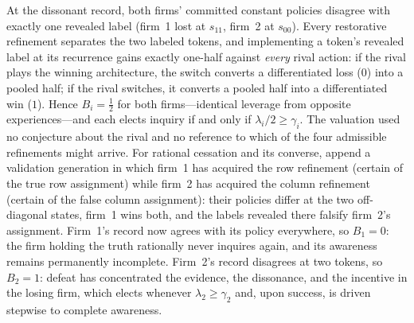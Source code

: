 \begin{excont}
At the dissonant record, both firms' committed constant policies disagree
with exactly one revealed label (firm~1 lost at $s_{11}$, firm~2 at
$s_{00}$).  Every restorative refinement separates the two labeled tokens,
and implementing a token's revealed label at its recurrence gains exactly
one-half against \emph{every} rival action: if the rival plays the winning
architecture, the switch converts a differentiated loss ($0$) into a pooled
half; if the rival switches, it converts a pooled half into a differentiated
win ($1$).  Hence $B_i=\tfrac12$ for both firms---identical leverage from
opposite experiences---and each elects inquiry if and only if
$\lambda_i/2\geq\gamma_i$.  The valuation used no conjecture about the
rival and no reference to which of the four admissible refinements might
arrive.  For rational cessation and its converse, append a validation
generation in which firm~1 has acquired the row refinement (certain of the
true row assignment) while firm~2 has acquired the column refinement
(certain of the false column assignment): their policies differ at the two
off-diagonal states, firm~1 wins both, and the labels revealed there
falsify firm~2's assignment.  Firm~1's record now agrees with its policy
everywhere, so $B_1=0$: the firm holding the truth rationally never
inquires again, and its awareness remains permanently incomplete.  Firm~2's
record disagrees at two tokens, so $B_2=1$: defeat has concentrated the
evidence, the dissonance, and the incentive in the losing firm, which
elects whenever $\lambda_2\geq\gamma_2$ and, upon success, is driven
stepwise to complete awareness.
\end{excont}

